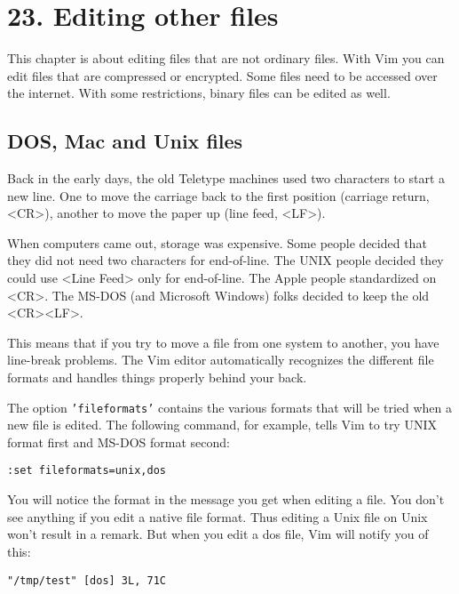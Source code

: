 \section{23. Editing other files}
This chapter is about editing files that are not ordinary files.  With Vim you
can edit files that are compressed or encrypted.  Some files need to be
accessed over the internet.  With some restrictions, binary files can be
edited as well.
\localtableofcontents
\subsection{DOS, Mac and Unix files}
Back in the early days, the old Teletype machines used two characters to start a new line.
One to move the carriage back to the first position (carriage return, <CR>), another to move the paper up (line feed, <LF>).

When computers came out, storage was expensive.
Some people decided that they did not need two characters for end-of-line.
The UNIX people decided they could use <Line Feed> only for end-of-line.
The Apple people standardized on <CR>.
The MS-DOS (and Microsoft Windows) folks decided to keep the old <CR><LF>.

This means that if you try to move a file from one system to another, you have line-break problems.
The Vim editor automatically recognizes the different file formats and handles things properly behind your back.

The option \texttt{'fileformats'} contains the various formats that will be tried when a new file is edited.
The following command, for example, tells Vim to try UNIX format first and MS-DOS format second:

\begin{Verbatim}[samepage=true]
 :set fileformats=unix,dos
\end{Verbatim}

You will notice the format in the message you get when editing a file.
You don't see anything if you edit a native file format.
Thus editing a Unix file on Unix won't result in a remark.
But when you edit a dos file, Vim will notify you of this:

\begin{Verbatim}[samepage=true]
    "/tmp/test" [dos] 3L, 71C 
\end{Verbatim}

